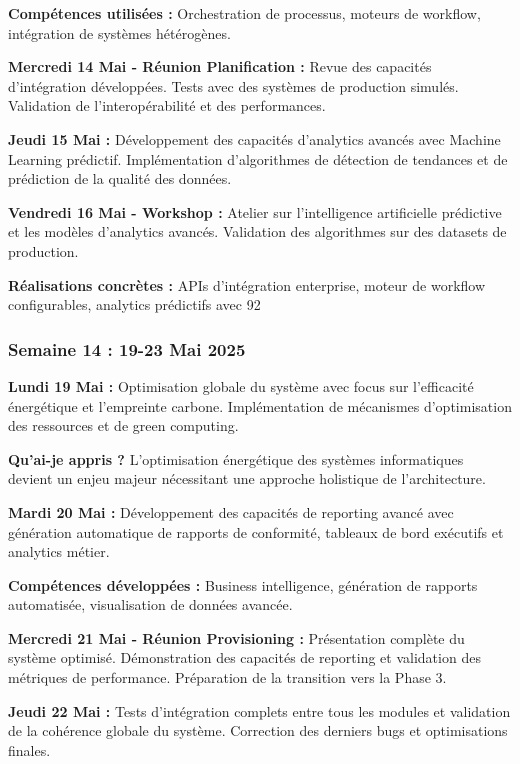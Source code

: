 \documentclass[a4paper,12pt]{article}
\begin{document}
\textbf{Compétences utilisées :} Orchestration de processus, moteurs de workflow, intégration de systèmes hétérogènes.

\textbf{Mercredi 14 Mai - Réunion Planification :}
Revue des capacités d'intégration développées. Tests avec des systèmes de production simulés. Validation de l'interopérabilité et des performances.

\textbf{Jeudi 15 Mai :}
Développement des capacités d'analytics avancés avec Machine Learning prédictif. Implémentation d'algorithmes de détection de tendances et de prédiction de la qualité des données.

\textbf{Vendredi 16 Mai - Workshop :}
Atelier sur l'intelligence artificielle prédictive et les modèles d'analytics avancés. Validation des algorithmes sur des datasets de production.

\textbf{Réalisations concrètes :} APIs d'intégration enterprise, moteur de workflow configurables, analytics prédictifs avec 92%

\subsubsection{Semaine 14 : 19-23 Mai 2025}

\textbf{Lundi 19 Mai :}
Optimisation globale du système avec focus sur l'efficacité énergétique et l'empreinte carbone. Implémentation de mécanismes d'optimisation des ressources et de green computing.

\textbf{Qu'ai-je appris ?} L'optimisation énergétique des systèmes informatiques devient un enjeu majeur nécessitant une approche holistique de l'architecture.

\textbf{Mardi 20 Mai :}
Développement des capacités de reporting avancé avec génération automatique de rapports de conformité, tableaux de bord exécutifs et analytics métier.

\textbf{Compétences développées :} Business intelligence, génération de rapports automatisée, visualisation de données avancée.

\textbf{Mercredi 21 Mai - Réunion Provisioning :}
Présentation complète du système optimisé. Démonstration des capacités de reporting et validation des métriques de performance. Préparation de la transition vers la Phase 3.

\textbf{Jeudi 22 Mai :}
Tests d'intégration complets entre tous les modules et validation de la cohérence globale du système. Correction des derniers bugs et optimisations finales.
\end{document}
